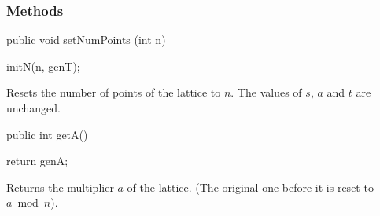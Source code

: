 \subsubsection*{Methods}
\begin{code}

   public void setNumPoints (int n) \begin{hide} {
      initN(n, genT);
   }\end{hide}
\end{code}
\begin{tabb}
  Resets the number of points of the lattice to $n$. The values of $s$,
  $a$ and $t$ are unchanged.
\end{tabb}
\begin{code}

   public int getA() \begin{hide} {
      return genA;
   }\end{hide}
\end{code}
\begin{tabb}
Returns the multiplier $a$ of the lattice.
(The original one before it is reset to $a \bmod n$).
\end{tabb}
\begin{code}
\begin{hide}

   public String toString() {
      StringBuffer sb = new StringBuffer ("KorobovLattice:" +
                                           PrintfFormat.NEWLINE);
      sb.append ("Multiplier a: " + genA + PrintfFormat.NEWLINE);
      sb.append (super.toString());
      return sb.toString();
   }
}\end{hide}
\end{code}
